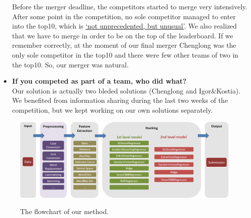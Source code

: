 \documentclass[12pt]{article}
\begin{document}
\begin{itemize}
Before the merger deadline, the competitors started to merge very intensively. After some point in the competition, no sole competitor managed to enter into the top10, which is \href{https://www.kaggle.com/c/home-depot-product-search-relevance/forums/t/20132/wow-nobody-competing-individually-in-the-top-10}{ `not unprecedented, but unusual'}. We also realized that we have to merge in order to be on the top of the leaderboard. If we remember correctly, at the moment of our final merger Chenglong was the only sole competitor in the top10 and  there were few other teams of two in the top10. So, our merger was natural.

\item \textbf{If you competed as part of a team, who did what?} \\
	Our solution is actually two bleded solutions (Chenglong and Igor\&Kostia). We benefited from information sharing during the last two weeks of the competition, but we kept working on our own solutions separately.


\end{itemize}


\begin{figure}[t]
  \centering
  \includegraphics[width=1\textwidth]{../Fig/FlowChart.jpg}\\
  \caption{The flowchart of our method.}
  \label{Fig:Flowchart}
\end{figure}
\end{document}
